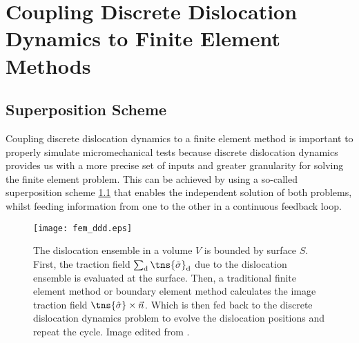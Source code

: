\chapter{Coupling Discrete Dislocation Dynamics to Finite Element Methods}
\label{c:ddd_fem}
\section{Superposition Scheme}
\label{s:sup_sch}
Coupling discrete dislocation dynamics to a finite element method \cite{analytic_tractions} is important to properly simulate micromechanical tests because discrete dislocation dynamics provides us with a more precise set of inputs and greater granularity for solving the finite element problem. This can be achieved by using a so-called superposition scheme \cref{f:fem_ddd} that enables the independent solution of both problems, whilst feeding information from one to the other in a continuous feedback loop.
\begin{figure}
	\centering
	\texttt{[image: fem\_ddd.eps]}
	\caption[Coupling Discrete Dislocation Dynamics to Finite Element Methods.]{The dislocation ensemble in a volume $ V $ is bounded by surface $ S $. First, the traction field $ \sum_{\textrm{d}} \tns{\tilde{\sigma}}_{\textrm{d}} $ due to the dislocation ensemble is evaluated at the surface. Then, a traditional finite element method or boundary element method calculates the image traction field $ \tns{\hat{\sigma}} \times \vec{n} $. Which is then fed back to the discrete dislocation dynamics problem to evolve the dislocation positions and repeat the cycle. Image edited from \cite{analytic_tractions}.}
	\label{f:fem_ddd}
\end{figure}
